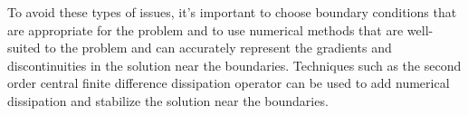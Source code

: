 \documentclass[a4paper]{report}
\begin{document}
To avoid these types of issues, it's important to choose boundary conditions 
that are appropriate for the problem and to use numerical methods that are 
well-suited to the problem and can accurately represent the gradients and 
discontinuities in the solution near the boundaries. 
Techniques such as the second order central finite difference dissipation 
operator can be used to add numerical dissipation and stabilize the solution near the boundaries.
%
%
%
%
%
\end{document}
